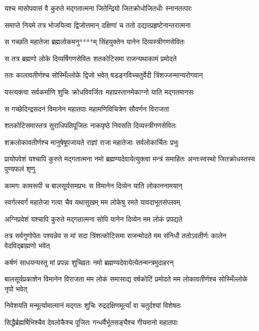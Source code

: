 \twolineshloka
{यश्च मासोपवासं वै कुरुते मद्गतात्मना}
{जितेन्द्रियो जितक्रोधोजितधीः स्नानतत्परः}


\twolineshloka
{समाप्ते नियमे तत्र भोजयित्वा द्विजोत्तमान्}
{दक्षिणां च ततो दद्यात्प्रहृष्टेनान्तरात्मना}


\twolineshloka
{स गच्छति महातेजा ब्रह्मलोकमनु****म्}
{सिंहयुक्तेन यानेन दिव्यस्त्रीगणसेवितः}


\twolineshloka
{स तत्र ब्रह्मणो लोके दिव्यर्षिगणसेवितः}
{शतकोटिसमा राजन्यथाकामं प्रमोदते}


\twolineshloka
{ततः कालावतीर्णश्च सोस्मिँल्लोके द्विजो भवेत्}
{षडङ्गविच्चतुर्वेदी त्रिंशज्जन्मान्यरोगवान्}


\twolineshloka
{यस्त्यक्त्वा सर्वकर्माणि शुचिः क्रोधविवर्जितः}
{महाप्रस्तानमेकाग्नो याति मद्गतमानसः}


\twolineshloka
{स गच्छेदिन्द्रसदनं विमानेन महातपाः}
{महामणिविचित्रेण सौवर्णन विराजता}


\twolineshloka
{शतकोटिसमास्तत्र सुराधिपतिपूजितः}
{नाकपृष्ठे निवसति दिव्यस्त्रीगणसेवितः}


\twolineshloka
{शक्रलोकावतीर्णश्च मानुषेषूपजायते}
{राज्ञां राजा महातेजाः सर्वलोकार्चितः प्रभुः}


\threelineshloka
{प्रायोपवेशं यश्चापि कुरुते मद्गतात्मना}
{नमो ब्रह्मण्यदेवायेत्युक्त्वा मन्त्रं समाहितः}
{अन्तःस्वस्थो जितक्रोधस्तस्य पुण्यफलं शृणु}


\twolineshloka
{कामगः कामरूपी च बालसूर्यसमप्रभः}
{स विमानेन दिव्येन याति लोकाननामयान्}


\twolineshloka
{स्वर्गत्स्वर्गं महातेजा गत्वा चैव यथासुखम्}
{मम लोकेषु रमते यावदाभूतसंप्लवम्}


\twolineshloka
{अग्निप्रवेशं यश्चापि कुरुते मद्गतात्मना}
{सोपि यानेन दिव्येन मम लोकं प्रपद्यते}


\threelineshloka
{तत्र सर्वगुणोपेतः पश्यन्नेव स मां सदा}
{त्रिंशत्कोटिसमा राजन्मोदते मम संनिधौ}
{ततोऽवतीर्णः कालेन वेदविद्ब्राह्मणो भवेत्}


\twolineshloka
{कर्षणं साधयन्यस्तु मां प्रपन्नः शुचिव्रतः}
{नमो ब्रह्मण्यदेवायेत्येतन्मन्त्रमुदाहरन्}


\threelineshloka
{बालसूर्यप्रकाशेन विमानेन विराजता}
{मम लोकं समासाद्य वर्षकोटिं प्रमोदते}
{मम लोकावतीर्णश्च सोस्मिँल्लोके नृपो भवेत्}


\twolineshloka
{निवेशयति मन्मूर्त्यामात्मानं मद्गतः शुचिः}
{रुद्रदक्षिणमूर्त्यां वा चतुर्दश्यां विशेषतः}


\twolineshloka
{सिद्धैर्ब्रह्मर्षिभिश्चैव देवलोकैश्च पूजितः}
{गन्धर्वैर्भूतसङ्घैश्च गीयमानो महातपाः}


